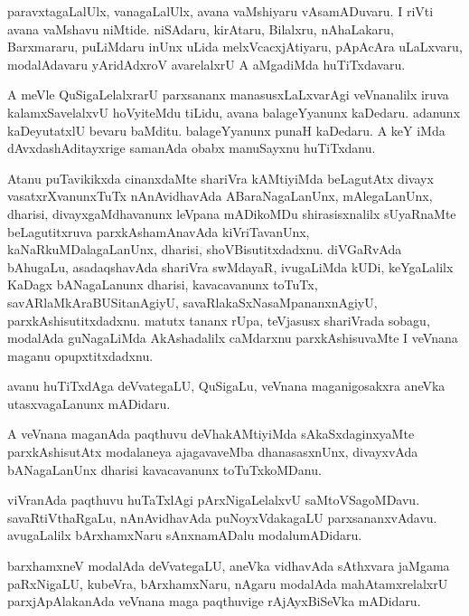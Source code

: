 \documentclass{article}
\begin{document}
\begin{mn}
paravxtagaLalUlx, vanagaLalUlx, avana vaMshiyaru vAsamADuvaru. I riVti avana 
vaMshavu niMtide. niSAdaru, kirAtaru, Bilalxru, nAhaLakaru, Barxmararu, 
puLiMdaru inUnx uLida melxVcacxjAtiyaru,  pApAcAra uLaLxvaru, modalAdavaru 
yAridAdxroV  avarelalxrU A aMgadiMda  huTiTxdavaru.
\end{mn}

\begin{mn}
A meVle QuSigaLelalxrarU parxsananx manasusxLaLxvarAgi veVnanalilx iruva 
kalamxSavelalxvU hoVyiteMdu tiLidu, avana balageYyanunx kaDedaru. adanunx 
kaDeyutatxlU bevaru baMditu. balageYyanunx punaH kaDedaru. A keY iMda 
dAvxdashAditayxrige samanAda obabx manuSayxnu huTiTxdanu.
\end{mn}

\begin{mn}
Atanu puTavikikxda cinanxdaMte shariVra kAMtiyiMda beLagutAtx  divayx 
vasatxrXvanunxTuTx nAnAvidhavAda ABaraNagaLanUnx,  mAlegaLanUnx, dharisi, 
divayxgaMdhavanunx leVpana mADikoMDu shirasisxnalilx  sUyaRnaMte beLagutitxruva 
parxkAshamAnavAda kiVriTavanUnx, kaNaRkuMDalagaLanUnx, dharisi, 
shoVBisutitxdadxnu.  diVGaRvAda bAhugaLu,  asadaqshavAda  shariVra swMdayaR, 
ivugaLiMda kUDi, keYgaLalilx  KaDagx bANagaLanunx dharisi, kavacavanunx 
toTuTx,  savARlaMkAraBUSitanAgiyU,  savaRlakaSxNasaMpananxnAgiyU,  
parxkAshisutitxdadxnu. matutx tananx rUpa, teVjasusx shariVrada sobagu, 
modalAda guNagaLiMda  AkAshadalilx caMdarxnu parxkAshisuvaMte I veVnana 
maganu opupxtitxdadxnu.  
\end{mn}

\begin{mn}
avanu huTiTxdAga deVvategaLU, QuSigaLu,  veVnana maganigosakxra aneVka utasxvagaLanunx mADidaru.
\end{mn}

\begin{mn}
A veVnana maganAda paqthuvu deVhakAMtiyiMda sAkaSxdaginxyaMte parxkAshisutAtx 
modalaneya ajagavaveMba dhanasasxnUnx, divayxvAda bANagaLanUnx  dharisi kavacavanunx toTuTxkoMDanu. 
\end{mn}

\begin{mn}
viVranAda paqthuvu huTaTxlAgi pArxNigaLelalxvU saMtoVSagoMDavu.  
savaRtiVthaRgaLu, nAnAvidhavAda puNoyxVdakagaLU parxsananxvAdavu. 
avugaLalilx bArxhamxNaru sAnxnamADalu modalumADidaru.
\end{mn}

\begin{mn}
barxhamxneV modalAda deVvategaLU, aneVka vidhavAda sAthxvara jaMgama 
paRxNigaLU, kubeVra, bArxhamxNaru, nAgaru modalAda mahAtamxrelalxrU 
parxjApAlakanAda veVnana maga paqthuvige rAjAyxBiSeVka mADidaru.
\end{mn}
\end{document}
